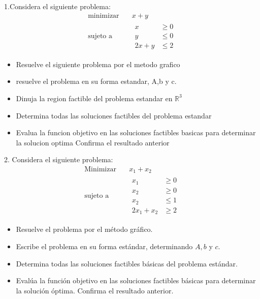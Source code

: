 \documentclass{article}
\begin{document}
1.Considera el siguiente problema:
\begin{equation*}
  \begin{aligned}
      \text{minimizar} \quad & x+y \\
      \text{sujeto a } \quad &
      \begin{aligned}
        x & \geq 0 \\
        y & \leq 0 \\
        2x+y & \leq 2
      \end{aligned}
  \end{aligned}
\end{equation*}
\begin{itemize}
\item Resuelve el siguiente problema por el metodo grafico
\item resuelve el problema en su forma estandar, A,b y c.
\item Dinuja la region factible del problema estandar en $\mathbb{R}^3$
\item Determina todas las soluciones factibles del problema estandar
  \item Evalua la funcion objetivo en las soluciones factibles basicas para determinar la solucion optima Confirma el resultado anterior
  \end{itemize}
  
2. Considera el siguiente problema:
\begin{equation*}
  \begin{aligned}
    \text{Minimizar}\quad  &   x_1+x_2 \\
    \text{sujeto a}\quad   &
    \begin{aligned}
      x_1     & \geq 0 \\
      x_2     & \geq 0 \\
      x_2     & \leq 1 \\
      2x_1+x_2  & \geq 2
    \end{aligned}
  \end{aligned}
\end{equation*}
\begin{itemize}
\item Resuelve el problema por el método gráfico.
\item Escribe el problema en su forma estándar, determinando $A, b$ y $c$.
\item Determina todas las soluciones factibles básicas del problema estándar.
\item Evalúa la función objetivo en las soluciones factibles básicas para determinar la solución óptima. Confirma el resultado anterior. 
\end{itemize}
\end{document}
